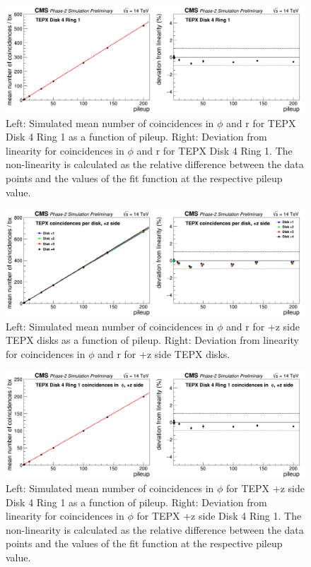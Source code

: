 \begin{figure}[H]
  \centering
  \includegraphics[width=1\columnwidth]{ashish_thesis/totalcoincidencesD4R1.png}
  \caption{Left: Simulated mean number of coincidences in $\phi$ and r for TEPX Disk 4 Ring 1 as a function of pileup. Right: Deviation from linearity for coincidences in $\phi$ and r for TEPX Disk 4 Ring 1. The non-linearity is calculated as the relative difference between the data points and the values of the fit function at the respective pileup value.}
  \label{fig:CMS}
\end{figure}





\begin{figure}[H]
  \centering
  \includegraphics[width=1\columnwidth]{ashish_thesis/coincidencesperdisk+z.png}
  \caption{Left: Simulated mean number of coincidences in $\phi$ and r for +z side TEPX disks as a function of pileup. Right: Deviation from linearity for coincidences in $\phi$ and r for +z side TEPX disks.}
  \label{fig:CMS}
\end{figure}


\begin{figure}[H]
  \centering
  \includegraphics[width=1\columnwidth]{ashish_thesis/coincidencesinphiD4R1z+.png}
  \caption{Left: Simulated mean number of coincidences in $\phi$ for TEPX +z side Disk 4 Ring 1 as a function of pileup. Right: Deviation from linearity for coincidences in $\phi$ for TEPX +z side Disk 4 Ring 1. The non-linearity is calculated as the relative difference between the data points and the values of the fit function at the respective pileup value.}
  \label{fig:CMS}
\end{figure}



